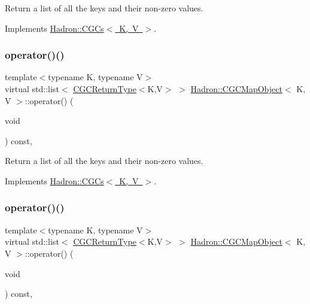 Return a list of all the keys and their non-\/zero values. 



Implements \mbox{\hyperlink{classHadron_1_1CGCs_ac709374b31c0319e82028b9d7c23e993}{Hadron\+::\+C\+G\+Cs$<$ K, V $>$}}.

\mbox{\label{classHadron_1_1CGCMapObject_aaa4b18e1a2845e16154cd434462c0779}} 
\subsubsection{\texorpdfstring{operator()()}{operator()()}\hspace{0.1cm}{\footnotesize\ttfamily [2/6]}}
{\footnotesize\ttfamily template$<$typename K, typename V$>$ \\
virtual std\+::list$<$ \mbox{\hyperlink{structHadron_1_1CGCReturnType}{C\+G\+C\+Return\+Type}}$<$K,V$>$ $>$ \mbox{\hyperlink{classHadron_1_1CGCMapObject}{Hadron\+::\+C\+G\+C\+Map\+Object}}$<$ K, V $>$\+::operator() (\begin{DoxyParamCaption}\item[{void}]{ }\end{DoxyParamCaption}) const\hspace{0.3cm}{\ttfamily [inline]}, {\ttfamily [virtual]}}



Return a list of all the keys and their non-\/zero values. 



Implements \mbox{\hyperlink{classHadron_1_1CGCs_ac709374b31c0319e82028b9d7c23e993}{Hadron\+::\+C\+G\+Cs$<$ K, V $>$}}.

\mbox{\label{classHadron_1_1CGCMapObject_aaa4b18e1a2845e16154cd434462c0779}} 
\subsubsection{\texorpdfstring{operator()()}{operator()()}\hspace{0.1cm}{\footnotesize\ttfamily [3/6]}}
{\footnotesize\ttfamily template$<$typename K, typename V$>$ \\
virtual std\+::list$<$ \mbox{\hyperlink{structHadron_1_1CGCReturnType}{C\+G\+C\+Return\+Type}}$<$K,V$>$ $>$ \mbox{\hyperlink{classHadron_1_1CGCMapObject}{Hadron\+::\+C\+G\+C\+Map\+Object}}$<$ K, V $>$\+::operator() (\begin{DoxyParamCaption}\item[{void}]{ }\end{DoxyParamCaption}) const\hspace{0.3cm}{\ttfamily [inline]}, {\ttfamily [virtual]}}



